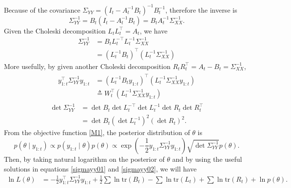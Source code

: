 Because of the covariance  $\Sigma_{YY} =  \left(I_t-A_t^{-1}B_t\right)^{-1}B_t^{-1}$, therefore the inverse is 
\begin{equation}\label{inverseYY}
\Sigma_{YY}^{-1} = B_t\left(I_t-A_t^{-1}B_t\right)= B_tA_t^{-1}\Sigma_{XX}^{-1}.
\end{equation}
Given the Choleski decomposition $L_tL_t^\top = A_t$, we have
\begin{equation}
\begin{split}
\Sigma_{YY}^{-1} &=B_tL_t^{-\top}L_t^{-1}\Sigma_{XX}^{-1}\\
&=\left(L_t^{-1}B_t\right)^\top\left(L_t^{-1}\Sigma_{XX}^{-1}\right) %
\end{split}
\end{equation}
More usefully, by given another Choleski decomposition $R_tR_t^\top=A_t-B_t=\Sigma_{XX}^{-1}$,
\begin{align}\label{sigmayy01}
\begin{split}
y_{1:t}^\top \Sigma_{YY}^{-1} y_{1:t} &= \left(L_t^{-1}B_ty_{1:t}\right)^\top\left(L_t^{-1}\Sigma_{XX}^{-1}y_{1:t}\right)\\
&\triangleq W_t^\top \left(L_t^{-1}\Sigma_{XX}^{-1}y_{1:t}\right)
\end{split}
\end{align}
\begin{equation}\label{sigmayy02}
\begin{split}
\det\Sigma_{YY}^{-1} &= \det B_t \det L_t^{-\top}\det L_t^{-1}\det R_t\det R_t^\top\\
&= \det B_t\left(\det L_t^{-1}\right)^2\left(\det R_t\right)^2.
\end{split}
\end{equation}
From the objective function \eqref{M1}, the posterior distribution of $\theta$ is 
\begin{equation}\label{posteriortheta}
p\left(\theta \mid y_{1:t}\right) \propto p\left(y_{1:t}\mid\theta\right)p\left(\theta\right) \propto \exp\left( -\frac{1}{2} y_{1:t} \Sigma_{YY}^{-1} y_{1:t} \right) \sqrt{\det \Sigma_{YY}^{-1}} p\left(\theta\right).
\end{equation}
Then, by taking natural logarithm on the posterior of $\theta$ and by using the useful solutions in equations \eqref{sigmayy01} and \eqref{sigmayy02}, we will have
\begin{align}\label{logposteriorL}
\ln L\left(\theta\right) &= -\frac{1}{2}y_{1:t}^\top\Sigma_{YY}^{-1}y_{1:t}+\frac{1}{2}\sum\ln\mbox{tr}\left(B_t\right)-\sum\ln\mbox{tr}\left(L_t\right)+\sum\ln\mbox{tr}\left(R_t\right) + \ln p\left(\theta\right).
\end{align}



